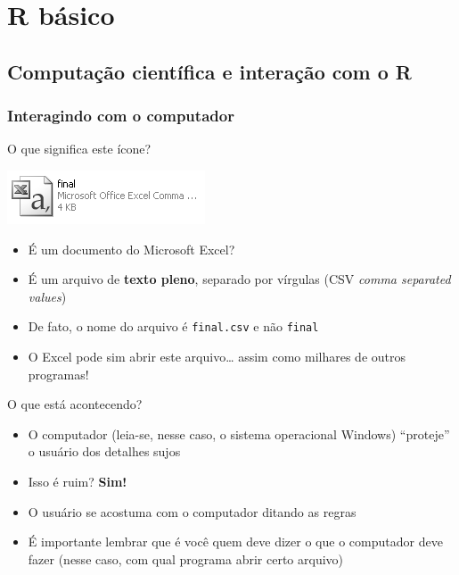 \documentclass[10pt,a4paper]{book}
\providecommand{\tightlist}{%
  \setlength{\itemsep}{0pt}\setlength{\parskip}{0pt}}
\begin{document}
\part{R básico}\label{part-r-basico}

\chapter{Computação científica e interação com o
R}\label{computacao-cientifica-e-interacao-com-o-r}

\section{Interagindo com o
computador}\label{interagindo-com-o-computador}

O que significa este ícone?

\begin{center}\includegraphics[width=0.5\linewidth]{img/excelcsvgrey} \end{center}

\begin{itemize}
\tightlist
\item
  É um documento do Microsoft Excel?
\item
  É um arquivo de \textbf{texto pleno}, separado por vírgulas (CSV
  \emph{comma separated values})
\item
  De fato, o nome do arquivo é \texttt{final.csv} e não \texttt{final}
\item
  O Excel pode sim abrir este arquivo\ldots{} assim como milhares de
  outros programas!
\end{itemize}

O que está acontecendo?

\begin{itemize}
\tightlist
\item
  O computador (leia-se, nesse caso, o sistema operacional Windows)
  ``proteje'' o usuário dos detalhes sujos
\item
  Isso é ruim? \textbf{Sim!}
\item
  O usuário se acostuma com o computador ditando as regras
\item
  É importante lembrar que é você quem deve dizer o que o computador
  deve fazer (nesse caso, com qual programa abrir certo arquivo)
\end{itemize}
\end{document}
